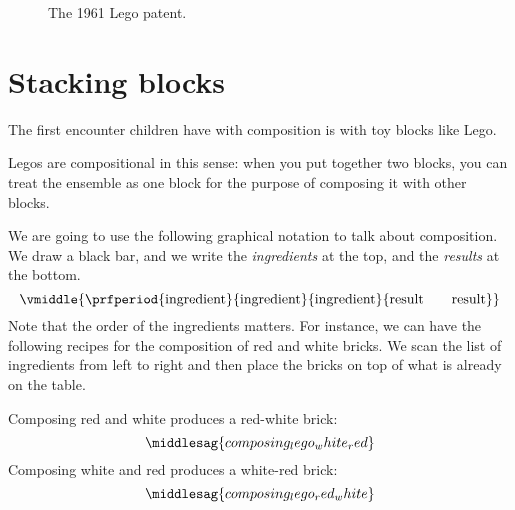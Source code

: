 \begin{figure*}[p]
    \centering
    \caption{The 1961 Lego patent.}
\end{figure*}

\section{Stacking blocks}


The first encounter children have with composition is with toy blocks like Lego.
%

Legos are compositional in this sense: when you put together two blocks, you can treat the ensemble as one block for the purpose of composing it with other blocks.

We are going to use the following graphical notation to talk about composition.
We draw a black bar, and we write the \emph{ingredients} at the top, and the \emph{results} at the bottom.
%
\begin{equation}
    \vmiddle{
        \prfperiod{
            \text{ingredient}
        }{
            \text{ingredient}
        }{
            \text{ingredient}
        }{
            \text{result} \quad \quad \text{result}
        }
    }
\end{equation}
%
Note that the order of the ingredients matters.
For instance, we can have the following recipes for the composition of red and white bricks.
We scan the list of ingredients from left to right and then place the bricks on top of what is already on the table.

Composing red and white produces a red-white brick:
%
\begin{equation}
    \label{eq:red-white}
    \middlesag{composing_lego_white_red}
\end{equation}
%
Composing white and red produces a white-red brick:
%
\begin{equation}
    \middlesag{composing_lego_red_white}
\end{equation}

